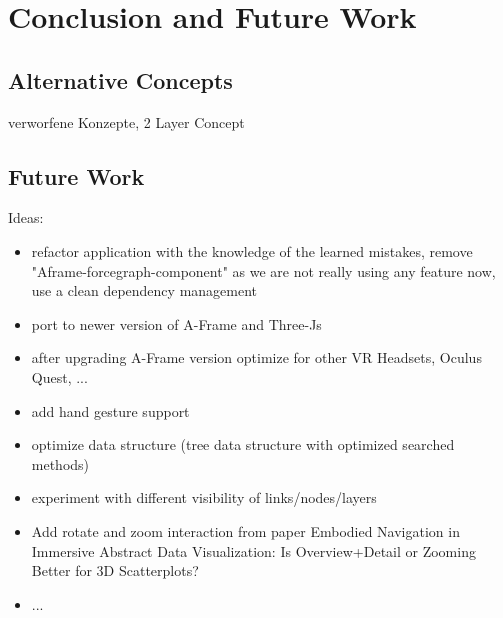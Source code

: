 \chapter{Conclusion and Future Work}

\section{Alternative Concepts}

verworfene Konzepte, 2 Layer Concept\\

\section{Future Work}
Ideas:
\begin{itemize}
    \item refactor application with the knowledge of the learned mistakes, remove "Aframe-forcegraph-component" as we are not really using any feature now, use a clean dependency management
    \item port to newer version of A-Frame and Three-Js
    \item after upgrading A-Frame version optimize for other VR Headsets, Oculus Quest, ... 
    \item add hand gesture support
    \item optimize data structure (tree data structure  with optimized searched methods)
    \item experiment with different visibility of links/nodes/layers
    \item Add rotate and zoom interaction from paper Embodied Navigation in Immersive Abstract Data Visualization:
    Is Overview+Detail or Zooming Better for 3D Scatterplots?
    \item ...
\end{itemize}


